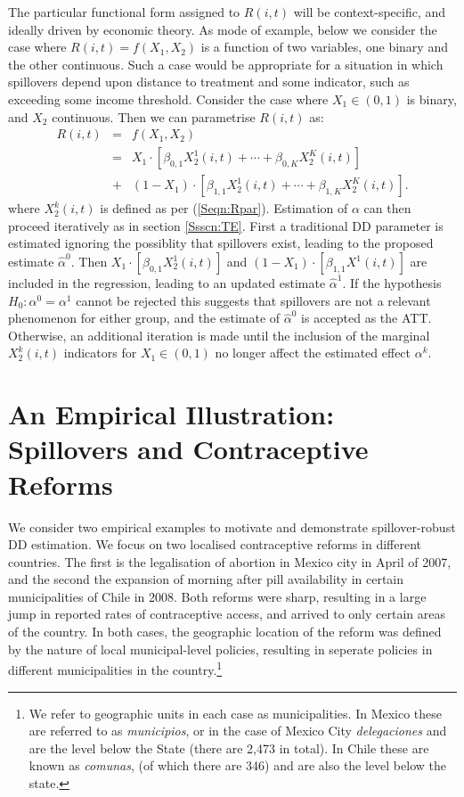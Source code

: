 The particular functional form assigned to $R(i,t)$ will be context-specific,
and ideally driven by economic theory.  As mode of example, below we consider the
case where $R(i,t)=f(X_1,X_2)$ is a function of two variables, one binary and
the other continuous.  Such a case would be appropriate for a situation in which
spillovers depend upon distance to treatment and some indicator, such as exceeding
some income threshold.  Consider the case where $X_1\in (0,1)$ is binary, and 
$X_2$ continuous.  Then we can parametrise $R(i,t)$ as:
\begin{eqnarray}
R(i,t)&=&f(X_1,X_2) \nonumber \\
      &=&X_1\cdot[\beta_{0,1}X_2^1(i,t)+ \cdots + \beta_{0,K}X_2^K(i,t)] \nonumber \\
      &+& (1-X_1)\cdot[\beta_{1,1}X_2^1(i,t)+ \cdots + \beta_{1,K}X_2^K(i,t)]. \nonumber
\end{eqnarray}
where $X_2^k(i,t)$ is defined as per (\ref{Seqn:Rpar}).  Estimation of $\alpha$ 
can then proceed iteratively as in section \ref{Ssscn:TE}.  First a traditional 
DD parameter is estimated ignoring the possiblity that spillovers exist, leading 
to the proposed estimate $\hat\alpha^0$.  Then $X_1\cdot[\beta_{0,1}X_2^1(i,t)]$ 
and $(1-X_1)\cdot[\beta_{1,1}X^1(i,t)]$ are included in the regression, leading to 
an updated estimate $\hat\alpha^1$.  If the hypothesis $H_0: \alpha^0=\alpha^1$ 
cannot be rejected this suggests that spillovers are not a relevant phenomenon 
for either group, and the estimate of $\hat\alpha^0$ is accepted as the ATT.  
Otherwise, an additional iteration is made until the inclusion of the marginal 
$X_2^k(i,t)$ indicators for $X_1 \in (0,1)$ no longer affect the estimated effect 
$\alpha^k$.

\section{An Empirical Illustration: Spillovers and Contraceptive Reforms}
We consider two empirical examples to motivate and demonstrate spillover-robust 
DD estimation.
We focus on two localised contraceptive reforms in different countries. The first
is the legalisation of abortion in Mexico city in April of 2007, and the second
the expansion of morning after pill availability in certain municipalities of 
Chile in 2008.  Both reforms were sharp, resulting in a large jump in reported
rates of contraceptive access, and arrived to only certain areas of the country.
In both cases, the geographic location of the reform was defined by the nature
of local municipal-level policies, resulting in seperate policies in different
municipalities in the country.\footnote{We refer to geographic units in each case
as municipalities.  In Mexico these are referred to as \emph{municipios}, or in 
the case of Mexico City \emph{delegaciones} and are the level below the State 
(there are 2,473 in total).  In Chile these are known as \emph{comunas}, (of 
which there are 346) and are also the level below the state.}

